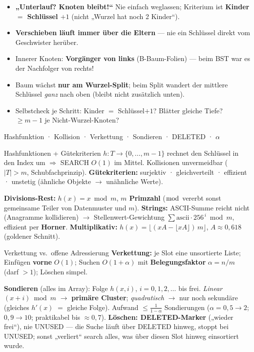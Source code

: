 \documentclass[10pt,a4paper]{article}
\newcommand{\zwischenthema}[2]{%
  \par\vspace{8pt}
  \noindent{\small\color{ohmred}\bfseries #1}\hfill{\small\color{black!55}#2}\par
  \vspace{-3pt}{\color{black!40}\rule{\linewidth}{0.4pt}}\par\vspace{3pt}}
\begin{document}
\begin{fallenbox}
\small\begin{itemize}
  \item \textbf{„Unterlauf? Knoten bleibt!``} Nie einfach weglassen; Kriterium ist
        \textbf{Kinder $=$ Schlüssel $+1$} (nicht „Wurzel hat noch 2 Kinder``).
  \item \textbf{Verschieben läuft immer über die Eltern} — nie ein Schlüssel direkt vom
        Geschwister herüber.
  \item Innerer Knoten: \textbf{Vorgänger von links} (B-Baum-Folien) — beim BST war es der
        Nachfolger von rechts!
  \item Baum wächst \textbf{nur am Wurzel-Split}; beim Split wandert der mittlere Schlüssel
        \emph{ganz} nach oben (bleibt nicht zusätzlich unten).
  \item Selbstcheck je Schritt: Kinder $=$ Schlüssel$+1$? Blätter gleiche Tiefe? $\ge m{-}1$ je
        Nicht-Wurzel-Knoten?
\end{itemize}
\end{fallenbox}

\zwischenthema{Hashtabellen}{Hashfunktion · Kollision · Verkettung · Sondieren · DELETED · $\alpha$}

\begin{defbox}{Hashfunktionen + Gütekriterien}
\small
$h\colon T \to \{0,\dots,m{-}1\}$ rechnet den Schlüssel in den Index um $\Rightarrow$ SEARCH
$O(1)$ im Mittel. Kollisionen unvermeidbar ($|T| > m$, Schubfachprinzip).
\textbf{Gütekriterien:} surjektiv · gleichverteilt · effizient · unstetig (ähnliche Objekte $\to$
unähnliche Werte).\par
\textbf{Divisions-Rest:} $h(x) = x \bmod m$, \textbf{$m$ Primzahl} ($\bmod$ vererbt sonst
gemeinsame Teiler von Datenmuster und $m$).
\textbf{Strings:} ASCII-Summe reicht nicht (Anagramme kollidieren) $\to$ Stellenwert-Gewichtung
$\sum \mathrm{ascii} \cdot 256^{\,i} \bmod m$, effizient per \textbf{Horner}.
\textbf{Multiplikativ:} $h(x) = \lfloor(x A - \lfloor x A\rfloor)\, m\rfloor$,
$A \approx 0{,}618$ (goldener Schnitt).
\end{defbox}

\begin{defbox}{Verkettung vs.\ offene Adressierung}
\small
\textbf{Verkettung:} je Slot eine unsortierte Liste; Einfügen \textbf{vorne} $O(1)$; Suchen
$O(1{+}\alpha)$ mit \textbf{Belegungsfaktor} $\alpha = n/m$ (darf $>1$); Löschen simpel.\par
\textbf{Sondieren} (alles im Array): Folge $h(x,i)$, $i = 0,1,2,\dots$ bis frei.
\emph{Linear} $(x{+}i) \bmod m$ $\to$ \textbf{primäre Cluster}; \emph{quadratisch} $\to$ nur noch
sekundäre (gleiches $h'(x)$ $=$ gleiche Folge). Aufwand $\le \frac{1}{1-\alpha}$ Sondierungen
($\alpha{=}0{,}5 \to 2$; $0{,}9 \to 10$; praktikabel bis $\approx 0{,}7$).
\textbf{Löschen: DELETED-Marker} („wieder frei``), nie UNUSED — die Suche läuft über DELETED
hinweg, stoppt bei UNUSED; sonst „verliert`` search alles, was über diesen Slot hinweg
einsortiert wurde.
\end{defbox}
\end{document}
